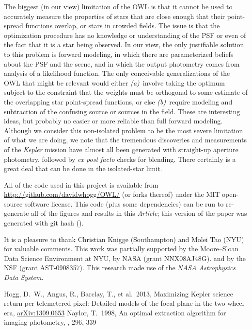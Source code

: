 \documentclass[12pt, letterpaper, preprint]{aastex}
\newcommand{\documentname}{\textsl{Article}}
\newcommand{\project}[1]{\textsl{#1}}
\newcommand{\foreign}[1]{\textsl{#1}}
\newcommand{\etal}{\foreign{et\,al.}}
\begin{document}
The biggest (in our view) limitation of the OWL is that it cannot be used
  to accurately measure the properties of stars
  that are close enough that their point-spread functions overlap,
  or stars in crowded fields.
The issue is that the optimization procedure has no knowledge or understanding
  of the PSF or even of the fact that it is a star being observed.
In our view, the only justifiable solution to this problem is forward modeling,
  in which there are parameterized beliefs about the PSF and the scene,
  and in which the output photometry comes from analysis of a likelihood function.
The only conceivable generalizations of the OWL that might be relevant would either
  \textsl{(a)}~involve taking the optimum subject to the constraint that the weights must be
  orthogonal to some estimate of the overlapping star point-spread functions, or else
  \textsl{(b)}~require modeling and subtraction of the confusing source or sources
  in the field.
These are interesting ideas,
  but probably no easier or more reliable than full forward modeling.
Although we consider this non-isolated problem to be the most severe limitation of what we are doing,
  we note that the tremendous discoveries and measurements of the \project{Kepler} mission
  have almost all been generated with straight-up aperture photometry,
  followed by \foreign{ex post facto} checks for blending.
There certainly is a great deal that can be done in the isolated-star limit.

All of the code used in this project is available
  from \url{http://github.com/davidwhogg/OWL/} (or forks thereof)
  under the MIT open-source software license.
This code (plus some dependencies) can be run
  to re-generate all of the figures and results in this \documentname;
  this version of the paper was generated with git hash
  \texttt{\githash} (\gitdate).

\acknowledgments
It is a pleasure to thank
  Christian Knigge (Southampton) and
  Molei Tao (NYU)
for valuable comments.
This work was partially supported by the Moore--Sloan Data Science Environment at NYU,
  by NASA (grant NNX08AJ48G).
  and by the NSF (grant AST-0908357).
This research made use of the \project{NASA Astrophysics Data System}.

\newcommand{\arxiv}[1]{\href{http://arxiv.org/abs/#1}{arXiv:#1}}
\begin{thebibliography}{}\raggedright
\bibitem[Hogg \etal(2013)]{hoggwhitepaper}
Hogg, D.~W., Angus, R., Barclay, T., et al.\ 2013,
Maximizing Kepler science return per telemetered pixel: Detailed models of the focal plane in the two-wheel era,
\arxiv{1309.0653}
Naylor, T.\ 1998,
An optimal extraction algorithm for imaging photometry,
\mnras, 296, 339
\end{thebibliography}
\end{document}
